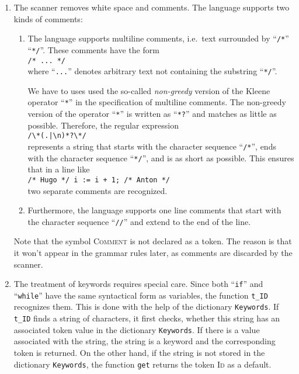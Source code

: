\begin{enumerate}
\item The scanner removes white space and comments.  The language supports two kinds of comments:
      \begin{enumerate}
      \item The language supports multiline comments, i.e.~text surrounded by ``\texttt{/*}'' ``\texttt{*/}''.
            These comments have the form
            \\[0.2cm]
            \hspace*{1.3cm}
            \texttt{/* ... */}
            \\[0.2cm]
            where ``\texttt{...}'' denotes arbitrary text not containing the substring ``\texttt{*/}''.

            We have to uses used the so-called \emph{non-greedy} version of the
            Kleene operator ``\texttt{*}'' in the specification of multiline comments. The non-greedy version of the
            operator ``\texttt{*}'' is written as ``\texttt{*?}'' and matches as little as possible. Therefore, the
            regular expression 
            \\[0.2cm]
            \hspace*{1.3cm}
            \verb$/\*(.|\n)*?\*/$ %
            \\[0.2cm]
            represents a string that starts with the character sequence ``\texttt{/*}'', ends with the
            character sequence ``\texttt{*/}'', and is as short as possible. This ensures that in a line like
            \\[0.2cm]
            \hspace*{1.3cm}
            \texttt{/* Hugo */ i := i + 1; /* Anton */}
            \\[0.2cm]
            two separate comments are recognized.
      \item Furthermore, the language supports one line comments that start with the character sequence ``\texttt{//}''
            and extend to the end of the line.
      \end{enumerate}
      Note that the symbol \textsc{Comment} is not declared as a token.  The reason is that it won't appear in the grammar
      rules later, as comments are discarded by the scanner.
\item The treatment of keywords requires special care.  Since both ``\texttt{if}'' and ``\texttt{while}'' have
      the same syntactical form as variables, the function \texttt{t\_ID} recognizes them.  This is done with
      the help of the dictionary \texttt{Keywords}.  If \texttt{t\_ID} finds a string of characters, it first
      checks, whether this string has an associated token value in the dictionary \texttt{Keywords}.  If there
      is a value associated with the string, the string is a keyword and the corresponding token is returned.
      On the other hand, if the string is not stored in the dictionary \texttt{Keywords}, the function
      \texttt{get} returns the token \textsc{Id} as a default. 
\end{enumerate}


